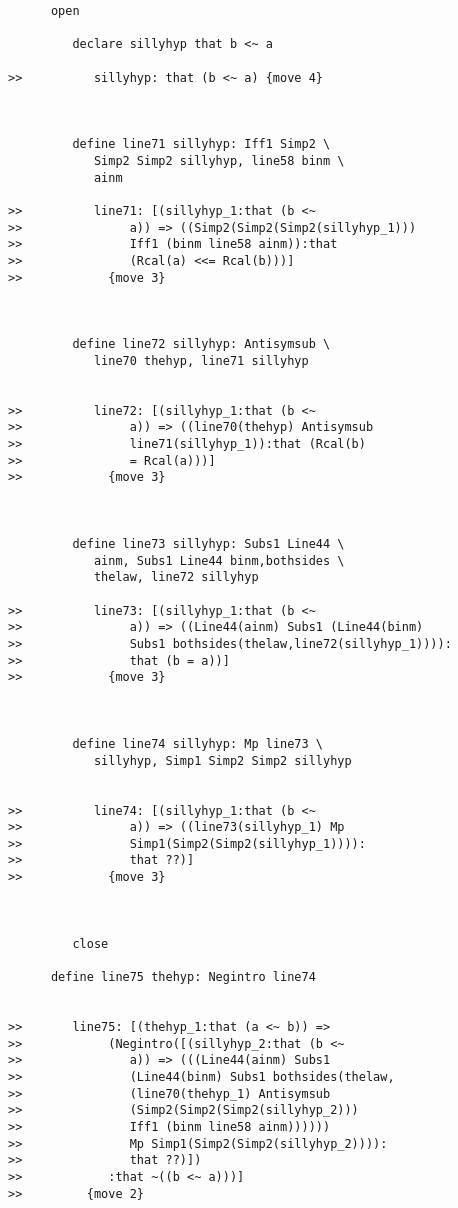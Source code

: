 \documentclass[12pt]{article}
\begin{document}
\begin{verbatim}
      open

         declare sillyhyp that b <~ a

>>          sillyhyp: that (b <~ a) {move 4}



         define line71 sillyhyp: Iff1 Simp2 \
            Simp2 Simp2 sillyhyp, line58 binm \
            ainm

>>          line71: [(sillyhyp_1:that (b <~
>>               a)) => ((Simp2(Simp2(Simp2(sillyhyp_1)))
>>               Iff1 (binm line58 ainm)):that
>>               (Rcal(a) <<= Rcal(b)))]
>>            {move 3}



         define line72 sillyhyp: Antisymsub \
            line70 thehyp, line71 sillyhyp


>>          line72: [(sillyhyp_1:that (b <~
>>               a)) => ((line70(thehyp) Antisymsub
>>               line71(sillyhyp_1)):that (Rcal(b)
>>               = Rcal(a)))]
>>            {move 3}



         define line73 sillyhyp: Subs1 Line44 \
            ainm, Subs1 Line44 binm,bothsides \
            thelaw, line72 sillyhyp

>>          line73: [(sillyhyp_1:that (b <~
>>               a)) => ((Line44(ainm) Subs1 (Line44(binm)
>>               Subs1 bothsides(thelaw,line72(sillyhyp_1)))):
>>               that (b = a))]
>>            {move 3}



         define line74 sillyhyp: Mp line73 \
            sillyhyp, Simp1 Simp2 Simp2 sillyhyp


>>          line74: [(sillyhyp_1:that (b <~
>>               a)) => ((line73(sillyhyp_1) Mp
>>               Simp1(Simp2(Simp2(sillyhyp_1)))):
>>               that ??)]
>>            {move 3}



         close

      define line75 thehyp: Negintro line74


>>       line75: [(thehyp_1:that (a <~ b)) =>
>>            (Negintro([(sillyhyp_2:that (b <~
>>               a)) => (((Line44(ainm) Subs1
>>               (Line44(binm) Subs1 bothsides(thelaw,
>>               (line70(thehyp_1) Antisymsub
>>               (Simp2(Simp2(Simp2(sillyhyp_2)))
>>               Iff1 (binm line58 ainm))))))
>>               Mp Simp1(Simp2(Simp2(sillyhyp_2)))):
>>               that ??)])
>>            :that ~((b <~ a)))]
>>         {move 2}




\end{verbatim}
\end{document}
